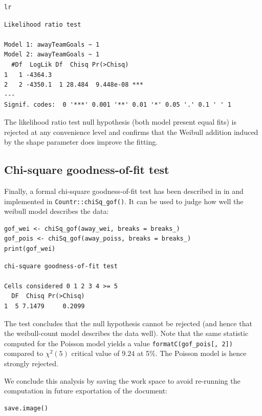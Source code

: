 \documentclass[a4paper,twoside,11pt]{article}
\begin{document}
\begin{verbatim}
lr
\end{verbatim}

\begin{verbatim}
Likelihood ratio test

Model 1: awayTeamGoals ~ 1
Model 2: awayTeamGoals ~ 1
  #Df  LogLik Df  Chisq Pr(>Chisq)    
1   1 -4364.3                         
2   2 -4350.1  1 28.484  9.448e-08 ***
---
Signif. codes:  0 '***' 0.001 '**' 0.01 '*' 0.05 '.' 0.1 ' ' 1
\end{verbatim}




The likelihood ratio test null hypothesis (both model present equal fits) is
rejected at any convenience level and confirms that the Weibull addition
induced by the shape parameter does improve the fitting.

\subsection{Chi-square goodness-of-fit test}
\label{sec:org3ce73a3}
Finally, a formal chi-square goodness-of-fit test has been described in in
\citet[Section 5.3.4]{cameron2013regression} and implemented in 
\texttt{Countr::chiSq\_gof()}. It can be used to judge how well the weibull model
describes the data:
\begin{verbatim}
gof_wei <- chiSq_gof(away_wei, breaks = breaks_)
gof_pois <- chiSq_gof(away_poiss, breaks = breaks_)
print(gof_wei)
\end{verbatim}

\begin{verbatim}
chi-square goodness-of-fit test

Cells considered 0 1 2 3 4 >= 5
  DF  Chisq Pr(>Chisq)
1  5 7.1479     0.2099
\end{verbatim}


The test concludes that the null hypothesis cannot be rejected (and hence that
the weibull-count model describes the data well). Note that the same statistic
computed for the Poisson model yields a value \texttt{\texttt{formatC(gof\_pois[, 2])}} compared to \(\chi^2(5)\) critical value of
\(9.24\) at 5\%. The Poisson model is hence strongly rejected.

\label{sec:orgc88e65d}
We conclude this analysis by saving the work space to avoid re-running the
computation in future exportation of the document:
\begin{verbatim}
save.image()
\end{verbatim}

\label{sec:org62466dd}


\end{document}
